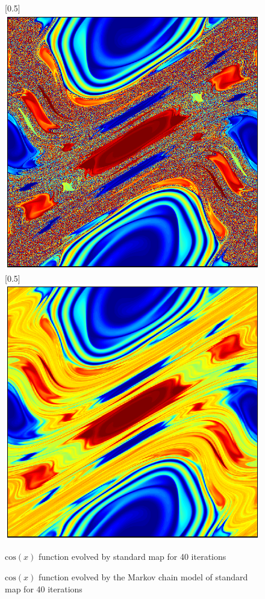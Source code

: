 \documentclass{article}
\begin{document}
\begin{figure}
\centerline{
\scalebox{0.5}[0.5]{\includegraphics{standardmapsimuexact.eps}}
\scalebox{0.5}[0.5]{\includegraphics{standardmapsimumarkov.eps}} }
\caption{\label{standardmapsimuexact}  $\text{cos}(x)$ function
evolved by standard map for 40 iterations}
\caption{\label{standardmapsimumarkov} $\text{cos}(x)$ function
evolved by the Markov chain model of standard map for 40 iterations}
\end{figure}
\end{document}
